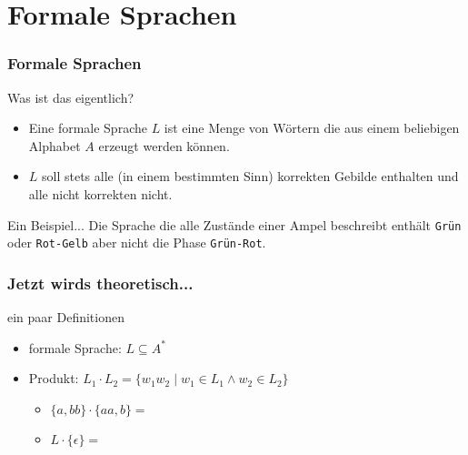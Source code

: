 \section[Sprachen]{Formale Sprachen}
\begin{frame}
	\frametitle{Formale Sprachen}
	\begin{block}{Was ist das eigentlich?} \pause
		\begin{itemize}
          \item Eine formale Sprache $L$ ist eine Menge von Wörtern die aus einem beliebigen Alphabet $A$ erzeugt werden können. \pause
          \item $L$ soll stets alle (in einem bestimmten Sinn) korrekten Gebilde enthalten und alle nicht korrekten nicht.
        \end{itemize}
	\end{block}
 \pause
	\begin{block}{Ein Beispiel...}
		Die Sprache die alle Zustände einer Ampel beschreibt enthält \texttt{Grün} oder \texttt{Rot-Gelb} aber nicht die Phase \texttt{Grün-Rot}.
	\end{block}
\end{frame}	
	
\begin{frame}
	\frametitle{Jetzt wirds theoretisch...}
	\begin{block}{ein paar Definitionen}
  \begin{itemize}
	  \item formale Sprache: $L\subseteq A^*$
	  \item Produkt: $L_1\cdot L_2 = \{w_1w_2 \mid w_1\in L_1 \land w_2\in L_2\}$
	  	\begin{itemize}
	  		\item $\{a,bb\}\cdot \{aa,b\}=$ \only<2->{$\{aaa,ab,bbaa,bbb\}$}
	  		\item $L \cdot \{\epsilon \} =$ \only<3->{$L$}
	  	\end{itemize}
	  \end{itemize}
  \end{block}
\end{frame}

